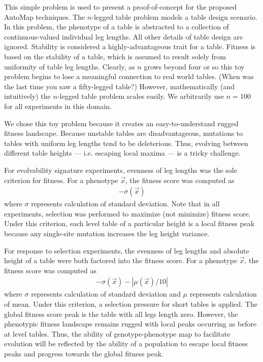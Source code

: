 This simple problem is used to present a proof-of-concept for the proposed AutoMap techniques.
The $n$-legged table problem models a table design scenario.
In this problem, the phenotype of a table is abstracted to a collection of continuous-valued individual leg lengths.
All other details of table design are ignored.
Stability is considered a highly-advantageous trait for a table.
Fitness is based on the stability of a table, which is assumed to result solely from uniformity of table leg lengths.
Clearly, as $n$ grows beyond four or so this toy problem begins to lose a meaningful connection to real world tables.
(When was the last time you saw a fifty-legged table?)
However, mathematically (and intuitively) the $n$-legged table problem scales easily.
We arbitrarily use $n=100$ for all experiments in this domain.

We chose this toy problem because it creates an easy-to-understand rugged fitness landscape.
Because unstable tables are disadvantageous, mutations to tables with uniform leg lengths tend to be deleterious.
Thus, evolving between different table heights --- i.e. escaping local maxima --- is a tricky challenge.

For evolvability signature experiments, evenness of leg lengths was the sole criterion for fitness.
For a phenotype $\vec{x}$, the fitness score was computed as
\begin{align*}
-\sigma(\vec{x})
\end{align*}
where $\sigma$ represents calculation of standard deviation.
Note that in all experiments, selection was performed to maximize (not minimize) fitness score.
Under this criterion, each level table of a particular height is a local fitness peak because any single-site mutation increases the leg height variance.

For response to selection experiments, the evenness of leg lengths and absolute height of a table were both factored into the fitness score.
For a phenotype $\vec{x}$, the fitness score was computed as
\begin{align*}
-\sigma(\vec{x}) - |\mu(\vec{x})/10|
\end{align*}
where $\sigma$ represents calculation of standard deviation and $\mu$ represents calculation of mean.
Under this criterion, a selection pressure for short tables is applied.
The global fitness score peak is the table with all legs length zero.
However, the phenotypic fitness landscape remains rugged with local peaks occurring as before at level tables.
Thus, the ability of genotype-phenotype map to facilitate evolution will be reflected by the ability of a population to escape local fitness peaks and progress towards the global fitness peak.

